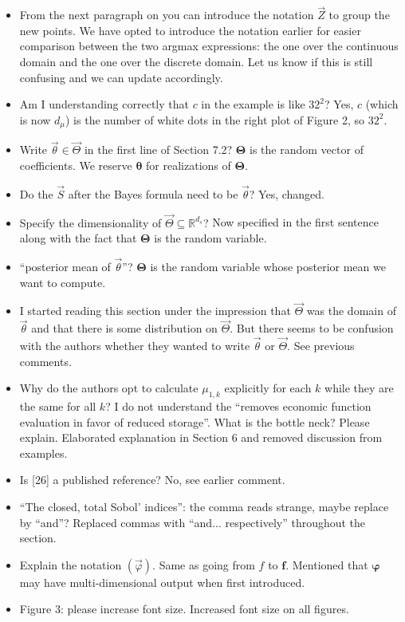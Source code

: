 \documentclass{article}[12pt]
\newcommand{\Referee}[1]{{\color{blue} #1 \newline}}
\begin{document}
\begin{itemize}
    \item \Referee{From the next paragraph on you can introduce the notation $\vec{Z}$ to group the new points.}We have opted to introduce the notation earlier for easier comparison between the two argmax expressions: the one over the continuous domain and the one over the discrete domain. Let us know if this is still confusing and we can update accordingly. 
    \item \Referee{Am I understanding correctly that $c$ in the example is like $32^2$?}Yes, $c$ (which is now $d_\mu$) is the number of white dots in the right plot of Figure 2, so $32^2$.
    \item \Referee{Write $\vec{\theta} \in \vec{\Theta}$ in the first line of Section 7.2?}$\boldsymbol{\Theta}$ is the random vector of coefficients. We reserve $\boldsymbol{\theta}$ for realizations of $\boldsymbol{\Theta}$. 
    \item \Referee{Do the $\vec{S}$ after the Bayes formula need to be $\vec{\theta}$?}Yes, changed. 
    \item \Referee{Specify the dimensionality of $\vec{\Theta} \subseteq \mathbb{R}^{d_s}$?}Now specified in the first sentence along with the fact that $\boldsymbol{\Theta}$ is the random variable.  
    \item \Referee{``posterior mean of $\vec{\theta}$''?}$\boldsymbol{\Theta}$ is the random variable whose posterior mean we want to compute. 
    \item \Referee{I started reading this section under the impression that $\vec{\Theta}$ was the domain of $\vec{\theta}$ and that there is some distribution on $\vec{\Theta}$. But there seems to be confusion with the authors whether they wanted to write $\vec{\theta}$ or $\vec{\Theta}$.}See previous comments. 
    \item \Referee{Why do the authors opt to calculate $\mu_{1,k}$ explicitly for each $k$ while they are the same for all $k$? I do not understand the ``removes economic function evaluation in favor of reduced storage''. What is the bottle neck? Please explain.}Elaborated explanation in Section 6 and removed discussion from examples. 
    \item \Referee{Is [26] a published reference?}No, see earlier comment.
    \item \Referee{``The closed, total Sobol' indices'': the comma reads strange, maybe replace by ``and''?}Replaced commas with ``and... respectively'' throughout the section. 
    \item \Referee{Explain the notation $(\vec{\varphi})$.}Same as going from $f$ to $\boldsymbol{f}$. Mentioned that $\boldsymbol{\varphi}$ may have multi-dimensional output when first introduced. 
    \item \Referee{Figure 3: please increase font size.}Increased font size on all figures.
\end{itemize}
\end{document}
